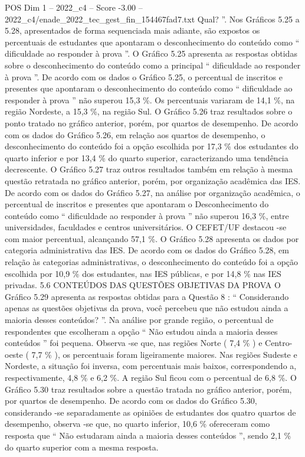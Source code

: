 \begin{textsample}{POS Dim 1 – 2022\_c4 – Score -3.00 – 2022\_c4/enade\_2022\_tec\_gest\_fin\_154467fad7.txt}
Qual? ”.
Nos Gráficos 5.25 a 5.28, apresentados de forma sequenciada mais adiante, são expostos os percentuais de estudantes que apontaram o desconhecimento do conteúdo como “ dificuldade ao responder à prova ”.
O Gráfico 5.25 apresenta as respostas obtidas sobre o desconhecimento do conteúdo como a principal “ dificuldade ao responder à prova ”.
De acordo com os dados o Gráfico 5.25, o percentual de inscritos e presentes que apontaram o desconhecimento do conteúdo como “ dificuldade ao responder à prova ” não superou 15,3 \%.
Os percentuais variaram de 14,1 \%, na região Nordeste, a 15,3 \%, na região Sul.
O Gráfico 5.26 traz resultados sobre o ponto tratado no gráfico anterior, porém, por quartos de desempenho.
De acordo com os dados do Gráfico 5.26, em relação aos quartos de desempenho, o desconhecimento do conteúdo foi a opção escolhida por 17,3 \% dos estudantes do quarto inferior e por 13,4 \% do quarto superior, caracterizando uma tendência decrescente.
O Gráfico 5.27 traz outros resultados também em relação à mesma questão retratada no gráfico anterior, porém, por organização acadêmica das IES.
De acordo com os dados do Gráfico 5.27, na análise por organização acadêmica, o percentual de inscritos e presentes que apontaram o Desconhecimento do conteúdo como “ dificuldade ao responder à prova ” não superou 16,3 \%, entre universidades, faculdades e centros universitários.
O CEFET/UF destacou -se com maior percentual, alcançando 57,1 \%.
O Gráfico 5.28 apresenta os dados por categoria administrativa das IES.
De acordo com os dados do Gráfico 5.28, em relação às categorias administrativas, o desconhecimento do conteúdo foi a opção escolhida por 10,9 \% dos estudantes, nas IES públicas, e por 14,8 \% nas IES privadas. 5.6 CONTEÚDOS DAS QUESTÕES OBJETIVAS DA PROVA O Gráfico 5.29 apresenta as respostas obtidas para a Questão 8 : “ Considerando apenas as questões objetivas da prova, você percebeu que não estudou ainda a maioria desses conteúdos? ”.
Na análise por grande região, o percentual de respondentes que escolheram a opção “ Não estudou ainda a maioria desses conteúdos ” foi pequena.
Observa -se que, nas regiões Norte ( 7,4 \% ) e Centro-oeste ( 7,7 \% ), os percentuais foram ligeiramente maiores.
Nas regiões Sudeste e Nordeste, a situação foi inversa, com percentuais mais baixos, correspondendo a, respectivamente, 4,8 \% e 6,2 \%.
A região Sul ficou com o percentual de 6,8 \%.
O Gráfico 5.30 traz resultados sobre a questão tratada no gráfico anterior, porém, por quartos de desempenho.
De acordo com os dados do Gráfico 5.30, considerando -se separadamente as opiniões de estudantes dos quatro quartos de desempenho, observa -se que, no quarto inferior, 10,6 \% ofereceram como resposta que “ Não estudaram ainda a maioria desses conteúdos ”, sendo 2,1 \% do quarto superior com a mesma resposta.

\end{textsample}
